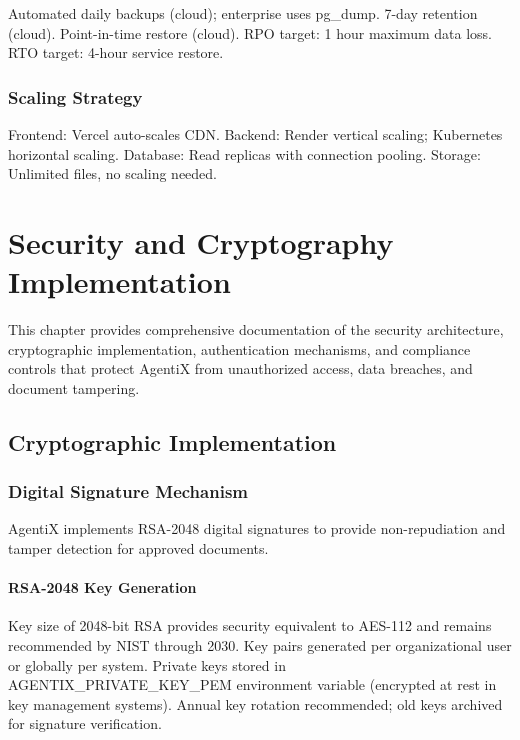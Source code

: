\documentclass[12pt,oneside,openright,a4paper]{cpe-english-project}
\begin{document}
Automated daily backups (cloud); enterprise uses pg\_dump. 7-day retention (cloud). Point-in-time restore (cloud). RPO target: 1 hour maximum data loss. RTO target: 4-hour service restore.

\subsubsection{Scaling Strategy}

Frontend: Vercel auto-scales CDN. Backend: Render vertical scaling; Kubernetes horizontal scaling. Database: Read replicas with connection pooling. Storage: Unlimited files, no scaling needed.

\section{Security and Cryptography Implementation}

This chapter provides comprehensive documentation of the security architecture, cryptographic implementation, authentication mechanisms, and compliance controls that protect AgentiX from unauthorized access, data breaches, and document tampering.

\vspace{1em}

\subsection{Cryptographic Implementation}

\subsubsection{Digital Signature Mechanism}

AgentiX implements RSA-2048 digital signatures to provide non-repudiation and tamper detection for approved documents.

\paragraph{RSA-2048 Key Generation}

Key size of 2048-bit RSA provides security equivalent to AES-112 and remains recommended by NIST through 2030. Key pairs generated per organizational user or globally per system. Private keys stored in AGENTIX\_PRIVATE\_KEY\_PEM environment variable (encrypted at rest in key management systems). Annual key rotation recommended; old keys archived for signature verification.
\end{document}
